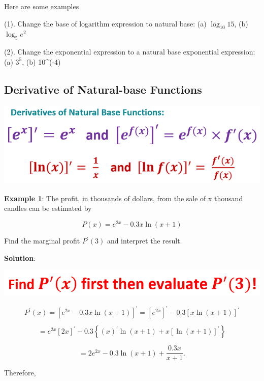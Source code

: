 \documentclass[
]{book}
\begin{document}
Here are some examples

(1). Change the base of logarithm expression to natural base: (a) \(\log_{10} 15\), (b) \(\log_5 e^2\)

(2). Change the exponential expression to a natural base exponential expression: (a) \(3^5\), (b) 10\^{}(-4)

\hfill\break

\hypertarget{derivative-of-natural-base-functions}{%
\subsection{Derivative of Natural-base Functions}\label{derivative-of-natural-base-functions}}

\hfill\break

\begin{center}\includegraphics[width=0.8\linewidth]{img06/w06-DerivativesExpLn} \end{center}

\hfill\break

\textbf{Example 1}: The profit, in thousands of dollars, from the sale of x thousand candles can be estimated by

\[
P(x) = e^{2x} - 0.3x \ln(x+1)
\]

Find the marginal profit \(P^\prime(3)\) and interpret the result.

\textbf{Solution}:

\begin{center}\includegraphics[width=0.8\linewidth]{img06/w06-ReviewExample01} \end{center}

\[
P^\prime(x) = [e^{2x} - 0.3x\ln(x+1)]^\prime = [e^{2x}]^\prime - 0.3[x\ln(x+1)]^\prime
\]

\[
=e^{2x}[2x]^\prime - 0.3\left\{(x)^\prime \ln(x+1) + x[\ln(x+1)]^\prime\right\}
\]

\[
= 2e^{2x}-0.3\ln(x+1) + \frac{0.3x}{x+1}.
\]

Therefore,
\end{document}

